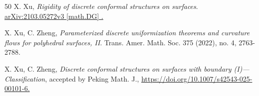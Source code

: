 \documentclass[12pt]{amsart}
\theoremstyle{definition}
\begin{document}
\begin{thebibliography}{50}
 X. Xu, \emph{Rigidity of discrete conformal structures on surfaces}. \href{https://arxiv.org/abs/2103.05272} {arXiv:2103.05272v3 [math.DG] .}


 X. Xu, C. Zheng, \emph{Parameterized discrete uniformization theorems and curvature flows for polyhedral surfaces, II}. Trans. Amer. Math. Soc. 375 (2022), no. 4, 2763-2788.

 X. Xu, C. Zheng, \emph{Discrete conformal structures on surfaces with boundary (I)---Classification}, accepted by Peking Math. J., \href{https://doi.org/10.1007/s42543-025-00101-6} {		https://doi.org/10.1007/s42543-025-00101-6.}



\end{thebibliography}
\end{document}
